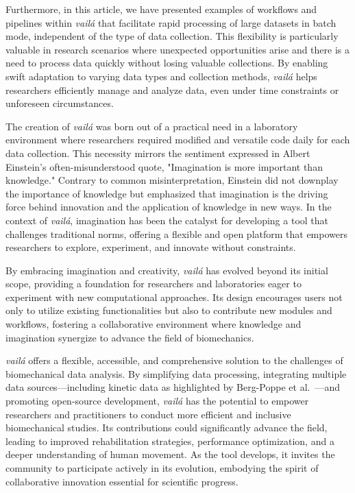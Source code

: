 \documentclass{article}
\begin{document}
Furthermore, in this article, we have presented examples of workflows and pipelines within \textit{vailá} that facilitate rapid processing of large datasets in batch mode, independent of the type of data collection. This flexibility is particularly valuable in research scenarios where unexpected opportunities arise and there is a need to process data quickly without losing valuable collections. By enabling swift adaptation to varying data types and collection methods, \textit{vailá} helps researchers efficiently manage and analyze data, even under time constraints or unforeseen circumstances.

The creation of \textit{vailá} was born out of a practical need in a laboratory environment where researchers required modified and versatile code daily for each data collection. This necessity mirrors the sentiment expressed in Albert Einstein's often-misunderstood quote, "Imagination is more important than knowledge." Contrary to common misinterpretation, Einstein did not downplay the importance of knowledge but emphasized that imagination is the driving force behind innovation and the application of knowledge in new ways. In the context of \textit{vailá}, imagination has been the catalyst for developing a tool that challenges traditional norms, offering a flexible and open platform that empowers researchers to explore, experiment, and innovate without constraints.

By embracing imagination and creativity, \textit{vailá} has evolved beyond its initial scope, providing a foundation for researchers and laboratories eager to experiment with new computational approaches. Its design encourages users not only to utilize existing functionalities but also to contribute new modules and workflows, fostering a collaborative environment where knowledge and imagination synergize to advance the field of biomechanics.

\textit{vailá} offers a flexible, accessible, and comprehensive solution to the challenges of biomechanical data analysis. By simplifying data processing, integrating multiple data sources—including kinetic data as highlighted by Berg-Poppe et al.~\citep{berg2018concurrent}—and promoting open-source development, \textit{vailá} has the potential to empower researchers and practitioners to conduct more efficient and inclusive biomechanical studies. Its contributions could significantly advance the field, leading to improved rehabilitation strategies, performance optimization, and a deeper understanding of human movement. As the tool develops, it invites the community to participate actively in its evolution, embodying the spirit of collaborative innovation essential for scientific progress.
\end{document}
